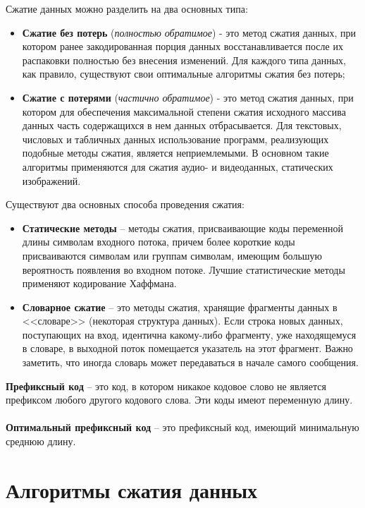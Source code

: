 Сжатие данных можно разделить на два основных типа:
\begin{itemize}
\item \textbf{Сжатие без потерь} (\emph{полностью обратимое}) - это метод сжатия данных, при котором ранее закодированная порция данных восстанавливается после их распаковки полностью без внесения изменений. Для каждого типа данных, как правило, существуют свои оптимальные алгоритмы сжатия без потерь;
\item \textbf{Сжатие с потерями} (\emph{частично обратимое}) -  это метод сжатия данных, при котором для обеспечения максимальной степени сжатия исходного массива данных часть содержащихся в нем данных отбрасывается. Для текстовых, числовых и табличных данных использование программ, реализующих подобные методы сжатия, является неприемлемыми. В основном такие алгоритмы применяются для сжатия аудио- и видеоданных, статических изображений.
\end{itemize}
Существуют два основных способа проведения сжатия:
\begin{itemize}
\item \textbf{Статические методы} -- методы сжатия, присваивающие коды переменной длины символам входного потока, причем более короткие коды присваиваются символам или группам символам, имеющим большую вероятность появления во входном потоке. Лучшие статистические методы применяют кодирование Хаффмана.
\item \textbf{Словарное сжатие} -- это методы сжатия, хранящие фрагменты данных в <<словаре>> (некоторая структура данных). Если строка новых данных, поступающих на вход, идентична какому-либо фрагменту, уже находящемуся в словаре, в выходной поток помещается указатель на этот фрагмент. Важно заметить, что иногда словарь может передаваться в начале самого сообщения.
\end{itemize}

\textbf{Префиксный код} -- это код, в котором никакое кодовое слово не является префиксом любого другого кодового слова. Эти коды имеют переменную длину.
\\
\\\textbf{Оптимальный префиксный код} -- это префиксный код, имеющий минимальную среднюю длину.
\\
\newpage
\section{Алгоритмы сжатия данных}
